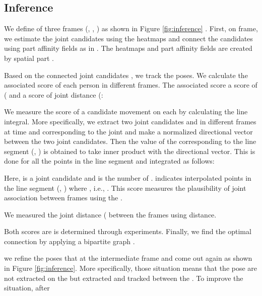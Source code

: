 \documentclass[conference]{IEEEtran}
\begin{document}
\subsection{Inference}
\label{sec:inference}



We define  of three frames (, , ) as shown in Figure \ref{fig:inference} . First, on  frame, we estimate the joint candidates using the  heatmaps and  connect the candidates using part affinity fields as in \cite{cao2017realtime}. The heatmaps and part affinity fields are created by  spatial part .

Based on the connected joint candidates , we track the poses. 
We calculate the associated score of each person in different frames. The associated score   a score of 
( and a score of joint distance (: 


We measure the score of a candidate movement on each 
by calculating the line integral. More specifically, we extract two joint candidates  and   in different frames at time  and  corresponding to the joint  and make a normalized directional vector between the two joint candidates. Then the value of the 
corresponding to the line segment (, ) is obtained to take inner product with the directional vector. This is done for all the points in the line segment and integrated as follows:

Here,  is a joint candidate and  is the number of .  indicates interpolated points in the line segment (, ) where , i.e., .
This score measures the plausibility of joint association between frames using the . 

We measured the joint distance ( between the frames using  distance. 

Both scores are  is determined through experiments. Finally, we find the optimal connection by applying a bipartite graph \cite{doering2018joint}. 



 we refine the poses that  at the intermediate frame and come out again as shown in  Figure \ref{fig:inference}. More specifically, those situation means that the pose are not extracted on the   but extracted and tracked between the  .
To improve the situation, after 
\end{document}
